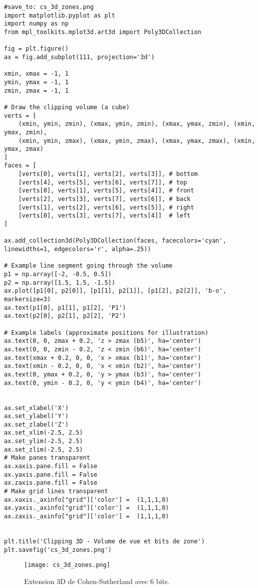 \documentclass{article}
\begin{document}
\begin{verbatim}
#save_to: cs_3d_zones.png
import matplotlib.pyplot as plt
import numpy as np
from mpl_toolkits.mplot3d.art3d import Poly3DCollection

fig = plt.figure()
ax = fig.add_subplot(111, projection='3d')

xmin, xmax = -1, 1
ymin, ymax = -1, 1
zmin, zmax = -1, 1

# Draw the clipping volume (a cube)
verts = [
    (xmin, ymin, zmin), (xmax, ymin, zmin), (xmax, ymax, zmin), (xmin, ymax, zmin),
    (xmin, ymin, zmax), (xmax, ymin, zmax), (xmax, ymax, zmax), (xmin, ymax, zmax)
]
faces = [
    [verts[0], verts[1], verts[2], verts[3]], # bottom
    [verts[4], verts[5], verts[6], verts[7]], # top
    [verts[0], verts[1], verts[5], verts[4]], # front
    [verts[2], verts[3], verts[7], verts[6]], # back
    [verts[1], verts[2], verts[6], verts[5]], # right
    [verts[0], verts[3], verts[7], verts[4]]  # left
]

ax.add_collection3d(Poly3DCollection(faces, facecolors='cyan', linewidths=1, edgecolors='r', alpha=.25))

# Example line segment going through the volume
p1 = np.array([-2, -0.5, 0.5])
p2 = np.array([1.5, 1.5, -1.5])
ax.plot([p1[0], p2[0]], [p1[1], p2[1]], [p1[2], p2[2]], 'b-o', markersize=3)
ax.text(p1[0], p1[1], p1[2], 'P1')
ax.text(p2[0], p2[1], p2[2], 'P2')

# Example labels (approximate positions for illustration)
ax.text(0, 0, zmax + 0.2, 'z > zmax (b5)', ha='center')
ax.text(0, 0, zmin - 0.2, 'z < zmin (b6)', ha='center')
ax.text(xmax + 0.2, 0, 0, 'x > xmax (b1)', ha='center')
ax.text(xmin - 0.2, 0, 0, 'x < xmin (b2)', ha='center')
ax.text(0, ymax + 0.2, 0, 'y > ymax (b3)', ha='center')
ax.text(0, ymin - 0.2, 0, 'y < ymin (b4)', ha='center')


ax.set_xlabel('X')
ax.set_ylabel('Y')
ax.set_zlabel('Z')
ax.set_xlim(-2.5, 2.5)
ax.set_ylim(-2.5, 2.5)
ax.set_zlim(-2.5, 2.5)
# Make panes transparent
ax.xaxis.pane.fill = False
ax.yaxis.pane.fill = False
ax.zaxis.pane.fill = False
# Make grid lines transparent
ax.xaxis._axinfo["grid"]['color'] =  (1,1,1,0)
ax.yaxis._axinfo["grid"]['color'] =  (1,1,1,0)
ax.zaxis._axinfo["grid"]['color'] =  (1,1,1,0)


plt.title('Clipping 3D - Volume de vue et bits de zone')
plt.savefig('cs_3d_zones.png')

\end{verbatim}

\begin{figure}[H]
\centering
\texttt{[image: cs\_3d\_zones.png]}
\caption{Extension 3D de Cohen-Sutherland avec 6 bits.}
\label{fig:cs_3d_zones}
\end{figure}
\end{document}
